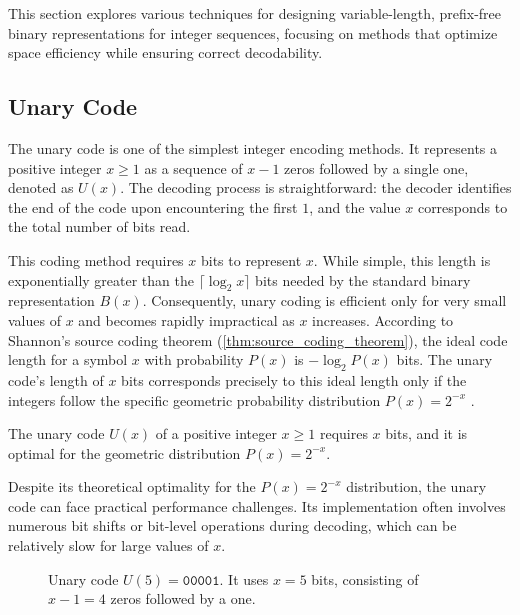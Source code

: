 \noindent This section explores various techniques for designing variable-length, prefix-free binary representations for integer sequences, focusing on methods that optimize space efficiency while ensuring correct decodability.

\subsection{Unary Code}
The unary code is one of the simplest integer encoding methods. It represents a positive integer $x \geq 1$ as a sequence of $x-1$ zeros followed by a single one, denoted as $U(x)$. The decoding process is straightforward: the decoder identifies the end of the code upon encountering the first $1$, and the value $x$ corresponds to the total number of bits read.

\noindent This coding method requires $x$ bits to represent $x$. While simple, this length is exponentially greater than the $\lceil\log_2 x \rceil$ bits needed by the standard binary representation $B(x)$. Consequently, unary coding is efficient only for very small values of $x$ and becomes rapidly impractical as $x$ increases. According to Shannon's source coding theorem (\autoref{thm:source_coding_theorem}), the ideal code length for a symbol $x$ with probability $P(x)$ is $-\log_2 P(x)$ bits. The unary code's length of $x$ bits corresponds precisely to this ideal length only if the integers follow the specific geometric probability distribution $P(x) = 2^{-x}$ \cite{witten1999managing, sayood2002lossless}.

\begin{theorem}
    The unary code $U(x)$ of a positive integer $x \ge 1$ requires $x$ bits, and it is optimal for the geometric distribution $P(x)=2^{-x}$.
\end{theorem}

\noindent Despite its theoretical optimality for the $P(x)=2^{-x}$ distribution, the unary code can face practical performance challenges. Its implementation often involves numerous bit shifts or bit-level operations during decoding, which can be relatively slow for large values of $x$.

\begin{figure}[hbtp]
    \centering
    \caption{Unary code $U(5) = \texttt{00001}$. It uses $x=5$ bits, consisting of $x-1=4$ zeros followed by a one.}
    \label{fig:unary_code_example}
\end{figure}

